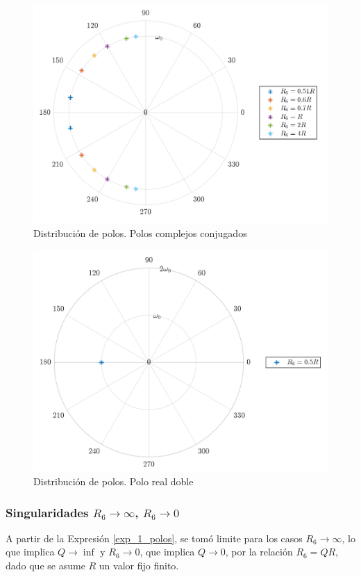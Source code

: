 \begin{figure}[ht]
\centering
\includegraphics[scale=0.5]{resources/1_polos_complejos}
\caption{Distribución de polos. Polos complejos conjugados}
\label{1_polos_complejos}
\end{figure}

\begin{figure}[ht]
\centering
\includegraphics[scale=0.5]{resources/1_polo_doble}
\caption{Distribución de polos. Polo real doble}
\label{1_polo_doble}
\end{figure}

\subsubsection{Singularidades $R_6 \rightarrow \infty$, $R_6 \rightarrow 0$}
A partir de la Expresión \ref{exp_1_polos}, se tomó limite para los casos $R_6 \rightarrow \infty$, lo que implica $Q \rightarrow \inf$ y $R_6 \rightarrow 0$, que implica $Q \rightarrow 0$, por la relación $R_6 = QR$, dado que se asume $R$ un valor fijo finito. 

